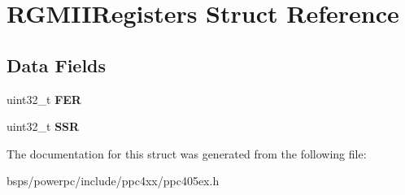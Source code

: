 \hypertarget{structRGMIIRegisters}{}\section{R\+G\+M\+I\+I\+Registers Struct Reference}
\label{structRGMIIRegisters}
\subsection*{Data Fields}
\begin{DoxyCompactItemize}
\item 
\mbox{\label{structRGMIIRegisters_a601bc82599f9af1f59d8ca8d48f28eff}} 
uint32\+\_\+t {\bfseries F\+ER}
\item 
\mbox{\label{structRGMIIRegisters_a1a959d8d3dee1eaf80f6d3ba9b61ae1c}} 
uint32\+\_\+t {\bfseries S\+SR}
\end{DoxyCompactItemize}


The documentation for this struct was generated from the following file\+:\begin{DoxyCompactItemize}
\item 
bsps/powerpc/include/ppc4xx/ppc405ex.\+h\end{DoxyCompactItemize}
